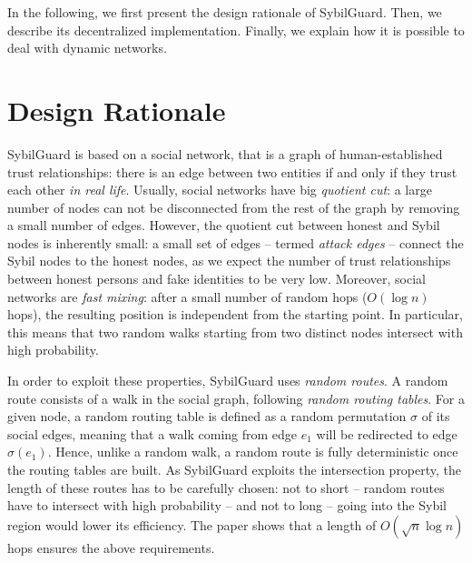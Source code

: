 \documentclass[a4paper,11pt]{article}
\begin{document}

In the following, we first present the design rationale of SybilGuard.
Then, we describe its decentralized implementation. Finally, we
explain how it is possible to deal with dynamic networks. 


\section{Design Rationale}


SybilGuard is based on a social network, that is a graph of
human-established trust relationships: there is an edge between two
entities if and only if they trust each other \emph{in real
life}. Usually, social networks have big \emph{quotient cut}: a large
number of nodes can not be disconnected from the rest of the graph by
removing a small number of edges. However, the quotient cut between
honest and Sybil nodes is inherently small: a small set of edges --
termed \emph{attack edges} -- connect the Sybil nodes to the honest
nodes, as we expect the number of trust relationships between honest
persons and fake identities to be very low. Moreover, social networks
are \emph{fast mixing}: after a small number of random hops ($O(\log
n)$ hops), the resulting position is independent from the starting
point.  In particular, this means that two random walks starting from
two distinct nodes intersect with high probability.


In order to exploit these properties, SybilGuard uses \emph{random
routes}. A random route consists of a walk in the social graph,
following \emph{random routing tables}. For a given node, a random routing
table is defined as a random permutation $\sigma$ of its social edges,
meaning that a walk coming from edge $e_1$ will be redirected to edge
$\sigma(e_1)$. Hence, unlike a random walk, a random route is fully
deterministic once the routing tables are built.
As SybilGuard exploits the intersection property, the length of these
routes has to be carefully chosen: not to short -- random routes have
to intersect with high probability -- and not to long -- going into
the Sybil region would lower its efficiency.  The paper shows that a
length of $O(\sqrt{n} \log n)$ hops ensures the above requirements.
\end{document}
